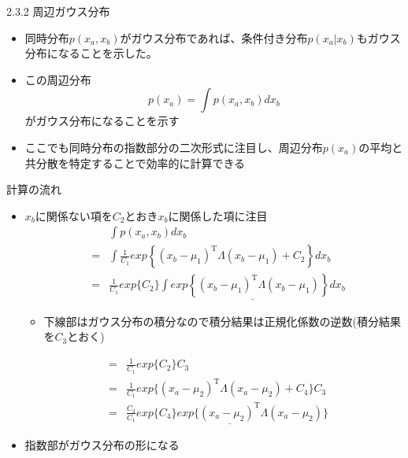 \begin{frame}{2.3.2 周辺ガウス分布}
 \begin{itemize}
  \item 同時分布$p(x_a,x_b)$がガウス分布であれば、条件付き分布$p(x_a|x_b)$もガウス分布になることを示した。
  \item この周辺分布
        \begin{equation}
         p(x_a) = \int p(x_a,x_b)dx_b
        \end{equation}
        がガウス分布になることを示す
  \item ここでも同時分布の指数部分の二次形式に注目し、周辺分布$p(x_a)$の平均と共分散を特定することで効率的に計算できる
 \end{itemize}
\end{frame}


\begin{frame}{計算の流れ}
 \begin{itemize}
  \item $x_b$に関係ない項を$C_2$とおき$x_b$に関係した項に注目
        \begin{eqnarray*}
         && \int p(x_a,x_b)dx_b \\
         &=& \int \frac{1}{C_1}exp\left\{(x_b-\mu_1)^{\mathrm{T}}\Lambda(x_b-\mu_1)+C_2\right\}dx_b \\
         &=& \frac{1}{C_1}exp\{C_2\}\underline{\int exp\left\{(x_b-\mu_1)^{\mathrm{T}}\Lambda(x_b-\mu_1)\right\}dx_b}
        \end{eqnarray*}
        \begin{itemize}
         \item 下線部はガウス分布の積分なので積分結果は正規化係数の逆数(積分結果を$C_3$とおく)
        \end{itemize}
        \begin{eqnarray*}
         &=&\frac{1}{C_1}exp\{C_2\}C_3 \\
         &=&\frac{1}{C_1}exp\{(x_a-\mu_2)^{\mathrm{T}}\Lambda (x_a-\mu_2)+C_4\}C_3\\
         &=&\frac{C_3}{C_1}\underline{exp\{C_4\}exp\{(x_a-\mu_2)^{\mathrm{T}}\Lambda (x_a-\mu_2)}\}
        \end{eqnarray*}
  \item 指数部がガウス分布の形になる
 \end{itemize}
\end{frame}


